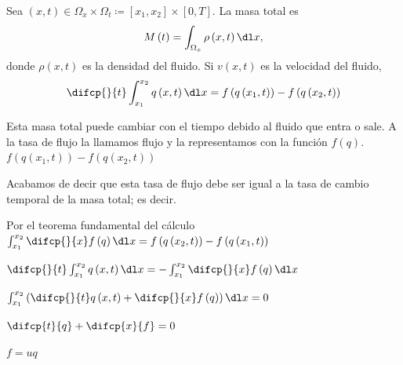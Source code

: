Sea
\begin{math}
    \left(x,t\right)\in
    \Omega_{x}\times\Omega_{t}\coloneqq
    \left[x_{1},x_{2}\right]\times
    \left[0,T\right]
\end{math}.
La masa total es
\begin{equation*}
    M\left(t\right)=
    \int_{\Omega_{x}}
    \rho\left(x,t\right)
    \dl x,
\end{equation*}
donde $\rho\left(x,t\right)$ es la densidad del fluido.
Si $v\left(x,t\right)$ es la velocidad del fluido,
\begin{equation*}
    \difcp{}{t}\int_{x_{1}}^{x_{2}}
    q\left(x,t\right)\dl x=
    f\left(q\left(x_{1},t\right)\right)-
    f\left(q\left(x_{2},t\right)\right)
\end{equation*}


Esta masa total puede cambiar con el tiempo debido al fluido que entra o sale.
A la tasa de flujo la llamamos flujo y la representamos con la función $f\left(q\right)$.
\begin{math}
    f\left(q\left(x_{1},t\right)\right)-
    f\left(q\left(x_{2},t\right)\right)
\end{math}

Acabamos de decir que esta tasa de flujo debe ser igual a la tasa de
cambio temporal de la masa total; es decir.



Por el teorema fundamental del cálculo
\begin{math}
    \int_{x_{1}}^{x_{2}}
    \difcp{}{x}
    f\left(q\right)
    \dl x=
    f\left(q\left(x_{2},t\right)\right)-
    f\left(q\left(x_{1},t\right)\right)
\end{math}

\begin{math}
    \difcp{}{t}
    \int_{x_{1}}^{x_{2}}
    q\left(x,t\right)
    \dl x=
    -\int_{x_{1}}^{x_{2}}
    \difcp{}{x}
    f\left(q\right)
    \dl x
\end{math}

\begin{math}
    \int_{x_{1}}^{x_{2}}
    \left(
    \difcp{}{t}
    q\left(x,t\right)+
    \difcp{}{x}f\left(q\right)
    \right)\dl x=
    0
\end{math}

\begin{math}
    \difcp{t}{q}+\difcp{x}{f}=0
\end{math}

$f=uq$

